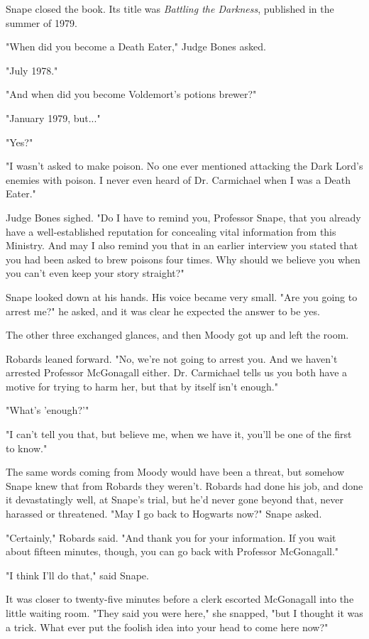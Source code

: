 \documentclass[a4paper,11pt]{article}
\begin{document}
Snape closed the book. Its title was \emph{Battling the Darkness}, published in the summer of 1979.

"When did you become a Death Eater," Judge Bones asked.

"July 1978."

"And when did you become Voldemort's potions brewer?"

"January 1979, but..."

"Yes?"

"I wasn't asked to make poison. No one ever mentioned attacking the Dark Lord's enemies with poison. I never even heard of Dr. Carmichael when I was a Death Eater."

Judge Bones sighed. "Do I have to remind you, Professor Snape, that you already have a well-established reputation for concealing vital information from this Ministry. And may I also remind you that in an earlier interview you stated that you had been asked to brew poisons four times. Why should we believe you when you can't even keep your story straight?"

Snape looked down at his hands. His voice became very small. "Are you going to arrest me?" he asked, and it was clear he expected the answer to be yes.

The other three exchanged glances, and then Moody got up and left the room.

Robards leaned forward. "No, we're not going to arrest you. And we haven't arrested Professor McGonagall either. Dr. Carmichael tells us you both have a motive for trying to harm her, but that by itself isn't enough."

"What's 'enough?'"

"I can't tell you that, but believe me, when we have it, you'll be one of the first to know."

The same words coming from Moody would have been a threat, but somehow Snape knew that from Robards they weren't. Robards had done his job, and done it devastatingly well, at Snape's trial, but he'd never gone beyond that, never harassed or threatened. "May I go back to Hogwarts now?" Snape asked.

"Certainly," Robards said. "And thank you for your information. If you wait about fifteen minutes, though, you can go back with Professor McGonagall."

"I think I'll do that," said Snape.

It was closer to twenty-five minutes before a clerk escorted McGonagall into the little waiting room. "They said you were here," she snapped, "but I thought it was a trick. What ever put the foolish idea into your head to come here now?"
\end{document}
